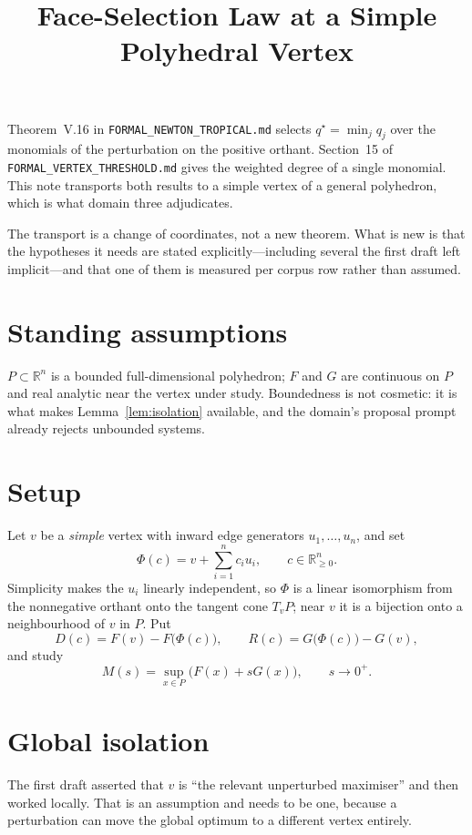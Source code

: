 \documentclass[11pt]{article}
\title{Face-Selection Law at a Simple Polyhedral Vertex}
\author{}
\date{}
\theoremstyle{definition}
\theoremstyle{remark}
\newcommand{\R}{\mathbb{R}}
\begin{document}
\maketitle

Theorem~V.16 in \texttt{FORMAL\_NEWTON\_TROPICAL.md} selects
$q^\star=\min_j q_j$ over the monomials of the perturbation on the positive
orthant. Section~15 of \texttt{FORMAL\_VERTEX\_THRESHOLD.md} gives the
weighted degree of a single monomial. This note transports both results to a
simple vertex of a general polyhedron, which is what domain three adjudicates.

The transport is a change of coordinates, not a new theorem. What is new is
that the hypotheses it needs are stated explicitly---including several the
first draft left implicit---and that one of them is measured per corpus row
rather than assumed.

\section{Standing assumptions}

$P\subset\R^n$ is a bounded full-dimensional polyhedron; $F$ and $G$ are
continuous on $P$ and real analytic near the vertex under study. Boundedness
is not cosmetic: it is what makes Lemma~\ref{lem:isolation} available, and the
domain's proposal prompt already rejects unbounded systems.

\section{Setup}

Let $v$ be a \emph{simple} vertex with inward edge generators
$u_1,\dots,u_n$, and set
\[
  \Phi(c)=v+\sum_{i=1}^{n}c_iu_i,\qquad c\in\R_{\ge0}^n .
\]
Simplicity makes the $u_i$ linearly independent, so $\Phi$ is a linear
isomorphism from the nonnegative orthant onto the tangent cone $T_vP$; near
$v$ it is a bijection onto a neighbourhood of $v$ in $P$. Put
\[
  D(c)=F(v)-F\bigl(\Phi(c)\bigr),
  \qquad
  R(c)=G\bigl(\Phi(c)\bigr)-G(v),
\]
and study
\[
  M(s)=\sup_{x\in P}\bigl(F(x)+sG(x)\bigr),\qquad s\to0^+ .
\]

\section{Global isolation}

The first draft asserted that $v$ is ``the relevant unperturbed maximiser''
and then worked locally. That is an assumption and needs to be one, because a
perturbation can move the global optimum to a different vertex entirely.
\end{document}
